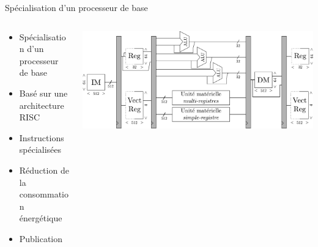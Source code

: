 \begin{frame}[c]{Spécialisation d'un processeur de base}
\renewcommand{\section}[2]{} %

  \begin{columns}
    \begin{column}{.40\textwidth}
    \vspace{-1cm}
      \begin{itemize}
        \item Spécialisation d'un processeur de base
        \item Basé sur une architecture RISC
        \item Instructions spécialisées
        \item<2-> Réduction de la consommation énergétique
        \item<2-> Publication 
  
      \end{itemize}
    \end{column}
    \begin{column}[T]{.60\textwidth}
    \vspace{-0.5cm}

  \begin{minipage}[c][0cm][t]{\textwidth}

    \only<+>
    { 

      \includegraphics[width=\textwidth]{./fig/archi_tensilica}
    }
    \only<+->
    {
    \begin{table}[t]
      \centering
      {\small{}}
\end{table}}
\end{minipage}
\end{column}
\end{columns}
\end{frame}
